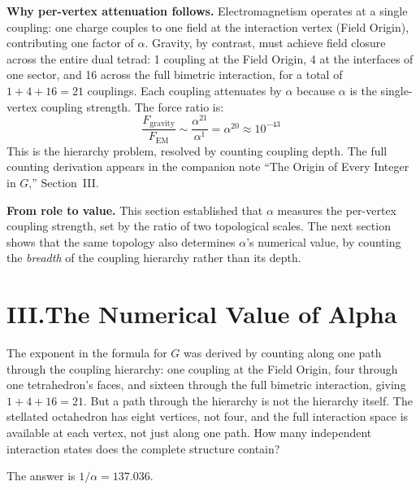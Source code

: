 \documentclass[11pt]{article}
\begin{document}
\textbf{Why per-vertex attenuation follows.}\quad
Electromagnetism operates at a single coupling: one charge couples to one field at the interaction vertex (Field Origin), contributing one factor of $\alpha$.
Gravity, by contrast, must achieve field closure across the entire dual tetrad: 1 coupling at the Field Origin, 4 at the interfaces of one sector, and 16 across the full bimetric interaction, for a total of $1 + 4 + 16 = 21$ couplings.
Each coupling attenuates by $\alpha$ because $\alpha$ is the single-vertex coupling strength.
The force ratio is:
\begin{equation*}
\frac{F_{\text{gravity}}}{F_{\text{EM}}} \sim \frac{\alpha^{21}}{\alpha^{1}} = \alpha^{20} \approx 10^{-43}
\end{equation*}
This is the hierarchy problem, resolved by counting coupling depth.
The full counting derivation appears in the companion note ``The Origin of Every Integer in $G$,'' Section~III.

\textbf{From role to value.}\quad
This section established that $\alpha$ measures the per-vertex coupling strength, set by the ratio of two topological scales.
The next section shows that the same topology also determines $\alpha$'s numerical value, by counting the \emph{breadth} of the coupling hierarchy rather than its depth.

\section*{III.\quad The Numerical Value of Alpha}

The exponent in the formula for $G$ was derived by counting along one path through the coupling hierarchy: one coupling at the Field Origin, four through one tetrahedron's faces, and sixteen through the full bimetric interaction, giving $1 + 4 + 16 = 21$.
But a path through the hierarchy is not the hierarchy itself.
The stellated octahedron has eight vertices, not four, and the full interaction space is available at each vertex, not just along one path.
How many independent interaction states does the complete structure contain?

The answer is $1/\alpha = 137.036$.
\end{document}
